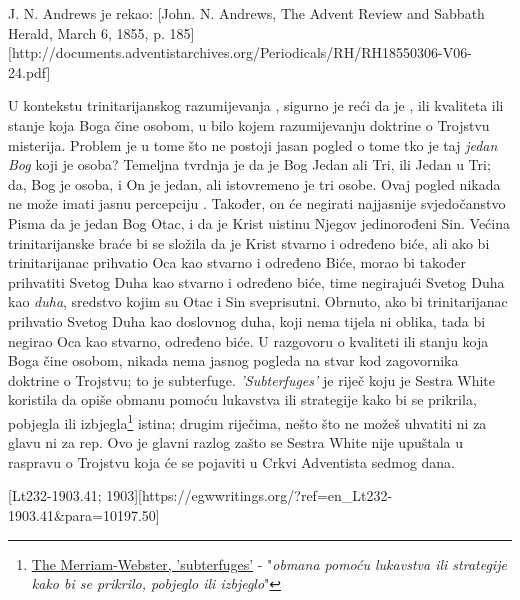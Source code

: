 J. N. Andrews je rekao: [John. N. Andrews, The Advent Review and Sabbath Herald, March 6, 1855, p. 185][http://documents.adventistarchives.org/Periodicals/RH/RH18550306-V06-24.pdf]

U kontekstu trinitarijanskog razumijevanja , sigurno je reći da je , ili kvaliteta ili stanje koja Boga čine osobom, u bilo kojem razumijevanju doktrine o Trojstvu misterija. Problem je u tome što ne postoji jasan pogled o tome tko je taj \textit{jedan Bog} koji je osoba? Temeljna tvrdnja je da je Bog Jedan ali Tri, ili Jedan u Tri; da, Bog je osoba, i On je jedan, ali istovremeno je tri osobe. Ovaj pogled nikada ne može imati jasnu percepciju . Također, on će negirati najjasnije svjedočanstvo Pisma da je jedan Bog Otac, i da je Krist uistinu Njegov jedinorođeni Sin. Većina trinitarijanske braće bi se složila da je Krist stvarno i određeno biće, ali ako bi trinitarijanac prihvatio Oca kao stvarno i određeno Biće, morao bi također prihvatiti Svetog Duha kao stvarno i određeno biće, time negirajući Svetog Duha kao \textit{duha}, sredstvo kojim su Otac i Sin sveprisutni. Obrnuto, ako bi trinitarijanac prihvatio Svetog Duha kao doslovnog duha, koji nema tijela ni oblika, tada bi negirao Oca kao stvarno, određeno biće. U razgovoru o kvaliteti ili stanju koja Boga čine osobom, nikada nema jasnog pogleda na stvar kod zagovornika doktrine o Trojstvu; to je subterfuge. \textit{'Subterfuges'} je riječ koju je Sestra White koristila da opiše obmanu pomoću lukavstva ili strategije kako bi se prikrila, pobjegla ili izbjegla\footnote{\href{https://www.merriam-webster.com/dictionary/subterfuges}{The Merriam-Webster, 'subterfuges'} - "\textit{obmana pomoću lukavstva ili strategije kako bi se prikrilo, pobjeglo ili izbjeglo}"} istina; drugim riječima, nešto što ne možeš uhvatiti ni za glavu ni za rep. Ovo je glavni razlog zašto se Sestra White nije upuštala u raspravu o Trojstvu koja će se pojaviti u Crkvi Adventista sedmog dana.

[Lt232-1903.41; 1903][https://egwwritings.org/?ref=en\_Lt232-1903.41&para=10197.50]

